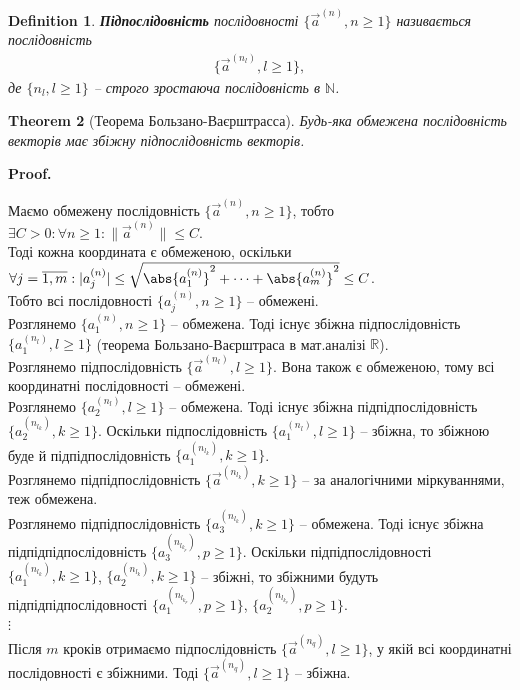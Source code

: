 \documentclass[a4paper, 10pt]{article}
\makeatletter
\theoremstyle{theoremdd}
\newtheorem{theorem}{Theorem}[subsection]
\theoremstyle{theoremdd}
\theoremstyle{theoremdd}
\newtheorem{definition}[theorem]{Definition}
\theoremstyle{theoremdd}
\theoremstyle{theoremdd}
\theoremstyle{theoremdd}
\theoremstyle{theoremdd}
\theoremstyle{theoremdd}
\theoremstyle{theoremdd}
\renewenvironment{proof}[1][Proof.\\]{\par
\pushQED{\hfill \qed}%
\normalfont \topsep6\p@\@plus6\p@\relax
\trivlist
\item\relax
{\bfseries
#1\@addpunct{.}}\hspace\labelsep\ignorespaces
}{%
\popQED\endtrivlist\@endpefalse
}
\newcommand\Norm[1]{\|#1\|}
\makeatother
\begin{document}
\begin{definition}
\textbf{Підпослідовність} послідовності $\{\vec{a}^{(n)}, n \geq 1 \}$ називається послідовність
\begin{align*}
\{\vec{a}^{(n_l)}, l \geq 1 \},
\end{align*}
де $\{n_l, l \geq 1 \}$ -- строго зростаюча послідовність в $\mathbb{N}$.
\end{definition}

\begin{theorem}[Теорема Бользано-Ваєрштрасса]
Будь-яка обмежена послідовність векторів має збіжну підпослідовність векторів.
\end{theorem}

\begin{proof}
Маємо обмежену послідовність $\{\vec{a}^{(n)}, n \geq 1\}$, тобто $\exists C > 0: \forall n \geq 1: \Norm{\vec{a}^{(n)}} \leq C$.\\
Тоді кожна координата є обмеженою, оскільки $\forall j = \overline{1,m}: |a_j^{(n)}| \leq \sqrt{\abs{a_1^{(n)}}^2 + \dots + \abs{a_m^{(n)}}^2} \leq C$.\\
Тобто всі послідовності $\{a_j^{(n)}, n \geq 1\}$ -- обмежені.\\
Розглянемо $\{a_1^{(n)}, n \geq 1\}$ -- обмежена. Тоді існує збіжна підпослідовність $\{a_1^{(n_l)}, l \geq 1\}$ (теорема Бользано-Ваєрштраса в мат.аналізі $\mathbb{R}$).\\
Розглянемо підпослідовність $\{\vec{a}^{(n_l)}, l \geq 1\}$. Вона також є обмеженою, тому всі координатні послідовності -- обмежені.\\
Розглянемо $\{a_2^{(n_l)}, l \geq 1\}$ -- обмежена. Тоді існує збіжна підпідпослідовність $\{a_2^{(n_{l_k})}, k \geq 1 \}$. Оскільки підпослідовність $\{a_1^{(n_l)}, l \geq 1 \}$ -- збіжна, то збіжною буде й підпідпослідовність $\{a_1^{(n_{l_k})}, k \geq 1 \}$.\\
Розглянемо підпідпослідовність $\{\vec{a}^{(n_{l_k})}, k \geq 1\}$ -- за аналогічними міркуваннями, теж обмежена.\\
Розглянемо підпідпослідовність $\{a_3^{(n_{l_k})}, k \geq 1 \}$ -- обмежена. Тоді існує збіжна підпідпідпослідовність $\{a_3^{(n_{l_{k_p}})}, p \geq 1 \}$. Оскільки підпідпослідовності $\{a_1^{(n_{l_k})}, k \geq 1 \}$, $\{a_2^{(n_{l_k})}, k \geq 1 \}$ -- збіжні, то збіжними будуть підпідпідпослідовності  $\{a_1^{(n_{l_{k_p}})}, p \geq 1 \}$, $\{a_2^{(n_{l_{k_p}})}, p \geq 1 \}$.\\
$\vdots$
\\
Після $m$ кроків отримаємо підпослідовність $\{\vec{a}^{(n_q)}, l \geq 1\}$, у якій всі координатні послідовності є збіжними. Тоді $\{\vec{a}^{(n_q)}, l \geq 1\}$ -- збіжна.
\end{proof}
\end{document}

